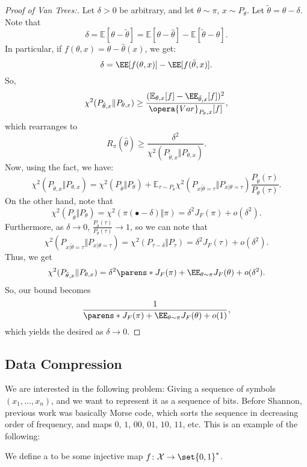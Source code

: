\begin{proof}
	[Proof of Van Trees:]
	Let $\delta > 0$ be arbitrary, and let $\theta \sim \pi$, $x\sim P_\theta$. Let $\tilde \theta = \theta - \delta$. Note that \[
		\delta = \mathbb E[\theta - \tilde \theta] = \mathbb E[\theta - \hat \theta] - \mathbb E[\tilde \theta - \hat \theta].
	\]
	In particular, if $f(\theta,x) = \theta - \hat\theta(x)$, we get: \[
		\delta = \EE[f(\theta, x)] - \EE[f(\tilde \theta, x)].
	\]So, \[
		\chi^2(P_{\tilde\theta, x} \Vert P_{\theta, x}) \geq \frac{(\mathbb E_{\theta, x}[f] - \EE_{\tilde\theta, x}[f])^2}{\opera{Var}_{P_\theta, x} [f]},
	\]
	which rearranges to \[
		R_\pi(\hat\theta) \geq \frac{\delta^2}{\chi^2(P_{\tilde \theta, x} \Vert P_{\theta, x})}.
	\]
	Now, using the fact, we have: \[
		\chi^2(P_{\tilde \theta, x} \Vert P_{\theta, x}) = \chi^2(P_{\tilde \theta} \Vert P_{\theta}) + \mathbb E_{\tau \sim P_\theta} \chi^2(P_{x|\tilde\theta = \tau} \Vert P_{x|\theta=\tau}) \frac{P_{\tilde\theta}(\tau)}{P_{\theta}(\tau)}.
	\]
	On the other hand, note that \[
		\chi^2(P_{\tilde\theta} \Vert P_\theta) = \chi^2(\pi(\bullet - \delta) \Vert \pi) = \delta^2 J_F(\pi) + o(\delta^2).
	\]
	Furthermore, as $\delta \to 0$, $\frac{P_{\tilde\theta}(\tau)}{P_\theta(\tau)}\to 1$, so we can note that \[
		\chi^2(P_{x|\tilde \theta = \tau} \Vert P_{x|\theta=\tau}) = \chi^2(P_{\tau -\delta} \Vert P_\tau) = \delta^2 J_F(\tau)  + o(\delta^2).
	\]
	Thus, we get \[
		\chi^2(P_{\tilde\theta, x} \Vert P_{\theta, x}) = \delta^2\parens*{J_F(\pi) + \EE_{\theta\sim \pi} J_F(\theta)} + o(\delta^2).
	\]
	So, our bound becomes \[
		\frac{1}{\parens*{J_F(\pi) + \EE_{\theta\sim \pi} J_F(\theta)} + o(1)},
	\]
	which yields the desired as $\delta \to 0$.
\end{proof}

\subsection{Data Compression}

We are interested in the following problem: Giving a sequence of symbols $(x_1, \ldots, x_n)$, and we want to represent it as a sequence of bits.
Before Shannon, previous work was basically Morse code, which sorts the sequence in decreasing order of frequency, and maps $0$, $1$, $00$, $01$, $10$, $11$, etc.
This is an example of the following:

\begin{defn}
	We define a  to be some injective map $f\colon \mathcal X \to \set{0,1}^*$.
\end{defn}

